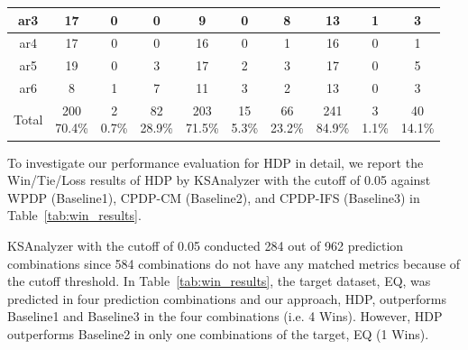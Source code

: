 \begin{table}[!t]
\begin{tabular}{|@{}c@{}||@{}c@{}|@{}c@{}|@{}c@{}||@{}c@{}|@{}c@{}|@{}c@{}||@{}c@{}|@{}c@{}|@{}c@{}|}
ar3	&17	&0 	&0	&9	&0 	&8	&13	&1 	&3\\ \hline
ar4	&17	&0 	&0	&16	&0 	&1	&16	&0 	&1\\ \hline
ar5	&19	&0 	&3	&17	&2 	&3	&17	&0 	&5\\ \hline
ar6	&8	&1 	&7	&11	&3 	&2	&13	&0 	&3\\ \hline
Total	&\specialcell{{200}\\{70.4\%}}	&\specialcell{{2}\\{0.7\%}}	&\specialcell{{82}\\{28.9\%}}	&\specialcell{{203}\\{71.5\%}}	&\specialcell{{15}\\{5.3\%}}	&\specialcell{{66}\\{23.2\%}}	&\specialcell{{241}\\{84.9\%}}	&\specialcell{{3}\\{1.1\%}}	&\specialcell{{40}\\{14.1\%}}\\ \hline

\end{tabular}
\end{table}


To investigate our performance evaluation for HDP in detail, we report
the Win/Tie/Loss results of HDP by KSAnalyzer with the cutoff of 0.05 against
WPDP (Baseline1), CPDP-CM (Baseline2), and CPDP-IFS
(Baseline3) in Table~\ref{tab:win_results}.


KSAnalyzer with the cutoff of 0.05 conducted 284 out of 962 prediction
combinations since 584 combinations do not have any matched
metrics because of the cutoff threshold. In
Table~\ref{tab:win_results}, the target dataset, EQ, was predicted in four
prediction combinations and our approach, HDP, outperforms Baseline1 and
Baseline3 in the four combinations (i.e. 4 Wins). However, HDP outperforms
Baseline2 in only one combinations of the target, EQ (1 Wins). 


